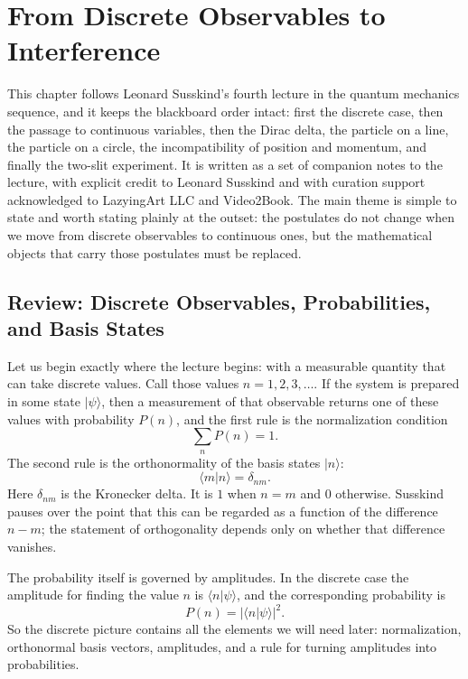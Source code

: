 \chapter{From Discrete Observables to Interference}

This chapter follows Leonard Susskind's fourth lecture in the quantum mechanics sequence, and it keeps the blackboard order intact: first the discrete case, then the passage to continuous variables, then the Dirac delta, the particle on a line, the particle on a circle, the incompatibility of position and momentum, and finally the two-slit experiment. It is written as a set of companion notes to the lecture, with explicit credit to Leonard Susskind and with curation support acknowledged to LazyingArt LLC and Video2Book. The main theme is simple to state and worth stating plainly at the outset: the postulates do not change when we move from discrete observables to continuous ones, but the mathematical objects that carry those postulates must be replaced.

\section{Review: Discrete Observables, Probabilities, and Basis States}

Let us begin exactly where the lecture begins: with a measurable quantity that can take discrete values. Call those values \(n=1,2,3,\dots\). If the system is prepared in some state \(|\psi\rangle\), then a measurement of that observable returns one of these values with probability \(P(n)\), and the first rule is the normalization condition
\begin{equation}
\sum_n P(n)=1.
\end{equation}
The second rule is the orthonormality of the basis states \(|n\rangle\):
\begin{equation}
\langle m|n\rangle=\delta_{nm}.
\end{equation}
Here \(\delta_{nm}\) is the Kronecker delta. It is \(1\) when \(n=m\) and \(0\) otherwise. Susskind pauses over the point that this can be regarded as a function of the difference \(n-m\); the statement of orthogonality depends only on whether that difference vanishes.

The probability itself is governed by amplitudes. In the discrete case the amplitude for finding the value \(n\) is \(\langle n|\psi\rangle\), and the corresponding probability is
\begin{equation}
P(n)=|\langle n|\psi\rangle|^2.
\end{equation}
So the discrete picture contains all the elements we will need later: normalization, orthonormal basis vectors, amplitudes, and a rule for turning amplitudes into probabilities.

